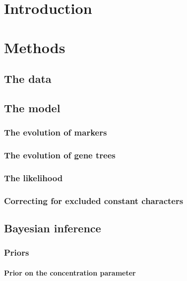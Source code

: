 \section{Introduction}

\ifembed{

}{}


\section{Methods}

\subsection{The data}

\subsection{The model}

\subsubsection{The evolution of markers}

\subsubsection{The evolution of gene trees}

\subsubsection{The likelihood}

\subsubsection{Correcting for excluded constant characters}

\subsection{Bayesian inference}

\subsubsection{Priors}

\paragraph{Prior on the concentration parameter}

